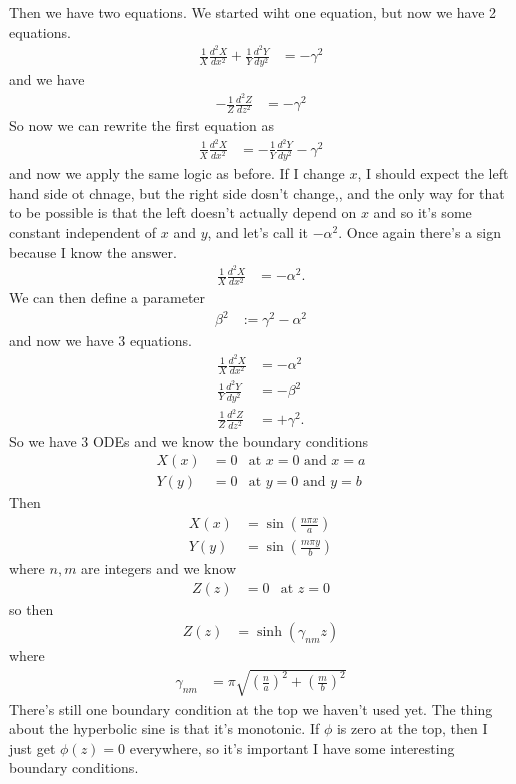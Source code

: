 Then we have two equations.
We started wiht one equation,
but now we have 2 equations.
\begin{align}
    \frac{1}{X}\frac{d^2 X}{dx^2}
    +
    \frac{1}{Y}\frac{d^2 Y}{dy^2}
    &=
    -\gamma^2
\end{align}
and we have
\begin{align}
    -\frac{1}{Z} \frac{d^2 Z}{dz^2} &= -\gamma^2
\end{align}
So now we can rewrite the first equation as
\begin{align}
    \frac{1}{X} \frac{d^2 X}{dx^2}
    &=
    -\frac{1}{Y} \frac{d^2 Y}{dy^2}
    - \gamma^2
\end{align}
and now we apply the same logic as before.
If I change $x$,
I should expect the left hand side ot chnage,
but the right side dosn't change,,
and the only way for that to be possible is that the left doesn't actually
depend on $x$ and so it's some constant independent of $x$ and $y$,
and let's call it $-\alpha^2$.
Once again there's a sign because I know the answer.
\begin{align}
    \frac{1}{X} \frac{d^2 X}{dx^2}
    &=
    -\alpha^2.
\end{align}
We can then define a parameter
\begin{align}
    \beta^2 &:= \gamma^2 - \alpha^2
\end{align}
and now we have 3 equations.
\begin{align}
    \frac{1}{X} \frac{d^2 X}{dx^2}
    &=
    -\alpha^2\\
    \frac{1}{Y}
    \frac{d^2 Y}{dy^2} &=
    -\beta^2\\
    \frac{1}{Z}\frac{d^2 Z}{dz^2} &=
    + \gamma^2.
\end{align}
So we have 3 ODEs and we know the boundary conditions
\begin{align}
    X(x) &= 0 &\text{at }x = 0 \text{ and } x = a\\
    Y(y) &= 0 &\text{at }y = 0 \text{ and } y = b
\end{align}
Then
\begin{align}
    X(x) &=
    \sin\left( \frac{n\pi x}{a} \right)\\
    Y(y) &=
    \sin\left( \frac{m\pi y}{b} \right)
\end{align}
where $n,m$ are integers
and we know
\begin{align}
    Z(z) &= 0 &\text{at } z = 0
\end{align}
so then
\begin{align}
    Z(z) &= \sinh\left( \gamma_{nm} z \right)
\end{align}
where
\begin{align}
    \gamma_{nm} &=
    \pi \sqrt{
    \left( \frac{n}{a} \right)^2
    +
    \left( \frac{m}{b} \right)^2
    }
\end{align}
There's still one boundary condition at the top we haven't used yet.
The thing about the hyperbolic sine is that it's monotonic.
If $\phi$ is zero at the top,
then I just get $\phi(z)=0$ everywhere,
so it's important I have some interesting boundary conditions.

